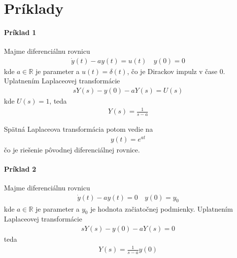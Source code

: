 \documentclass[a4paper, 10pt, ]{article}
\begin{document}
\section{Príklady}



\paragraph{Príklad 1}

Majme diferenciálnu rovnicu
\begin{align}
    \dot y(t) - a y(t) = u(t) \quad y(0) = 0
\end{align}
kde $a \in \mathbb R$ je parameter a $u(t) = \delta(t)$, čo je Dirackov impulz v čase $0$. Uplatnením Laplaceovej transformácie
\begin{align}
    sY(s) - y(0) - a Y(s) = U(s)
\end{align}
kde $U(s) = 1$, teda
\begin{align}
    Y(s) = \frac{1}{s - a}
\end{align}

Spätná Laplaceova transformácia potom vedie na
\begin{align}
    y(t) = e^{at}
\end{align}
čo je riešenie pôvodnej diferenciálnej rovnice.



\paragraph{Príklad 2}

Majme diferenciálnu rovnicu
\begin{align}
    \dot y(t) - a y(t) = 0 \quad y(0) = y_0
\end{align}
kde $a \in \mathbb R$ je parameter a $y_0$ je hodnota začiatočnej podmienky. Uplatnením Laplaceovej transformácie
\begin{align}
    sY(s) - y(0) - a Y(s) = 0
\end{align}
teda
\begin{align}
    Y(s) = \frac{1}{s - a} y(0)
\end{align}
\end{document}
